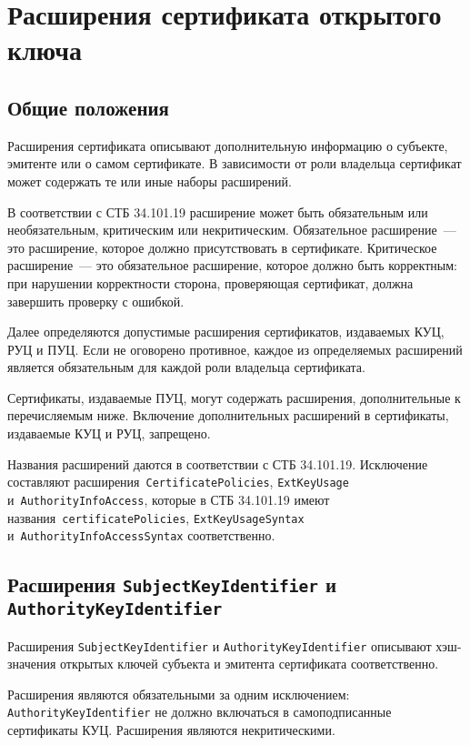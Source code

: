 \section{Расширения сертификата открытого ключа}\label{FMT.Ext}

\subsection{Общие положения}\label{FMT.Ext.Intro} 

Расширения сертификата описывают дополнительную информацию о субъекте,
эмитенте или о самом сертификате. В зависимости от роли владельца 
сертификат может содержать те или иные наборы расширений.

В соответствии с СТБ 34.101.19 расширение может быть обязательным или 
необязательным, критическим или некритическим. 
Обязательное расширение~--- это расширение, которое должно присутствовать 
в сертификате.  Критическое расширение~--- это обязательное  
расширение, которое должно быть корректным: при нарушении корректности
сторона, проверяющая сертификат, должна завершить проверку с ошибкой.

Далее определяются допустимые расширения сертификатов, издаваемых КУЦ, РУЦ и ПУЦ. 
Если не оговорено противное, каждое из определяемых расширений является 
обязательным для каждой роли владельца сертификата. 

Сертификаты, издаваемые ПУЦ, могут содержать расширения, 
дополнительные к перечисляемым ниже. Включение дополнительных расширений в 
сертификаты, издаваемые КУЦ и РУЦ, запрещено.

Названия расширений даются в соответствии с СТБ 34.101.19.
Исключение составляют расширения~\texttt{CertificatePolicies},
\texttt{ExtKeyUsage} и~\texttt{AuthorityInfoAccess},
которые в СТБ 34.101.19 имеют названия~\texttt{certificatePolicies}, 
\texttt{ExtKeyUsageSyntax} и~\texttt{AuthorityInfoAccessSyntax}
соответственно.

\subsection{Расширения \texttt{SubjectKeyIdentifier} и 
\texttt{AuthorityKeyIdentifier}}\label{FMT.Ext.SKID} 

Расширения \texttt{SubjectKeyIdentifier} и \texttt{AuthorityKeyIdentifier} 
описывают хэш-значения открытых ключей субъекта и эмитента сертификата 
соответственно. 

Расширения являются обязательными за одним исключением:
\texttt{AuthorityKeyIdentifier} не должно включаться в самоподписанные 
сертификаты КУЦ. Расширения являются некритическими. 
 
